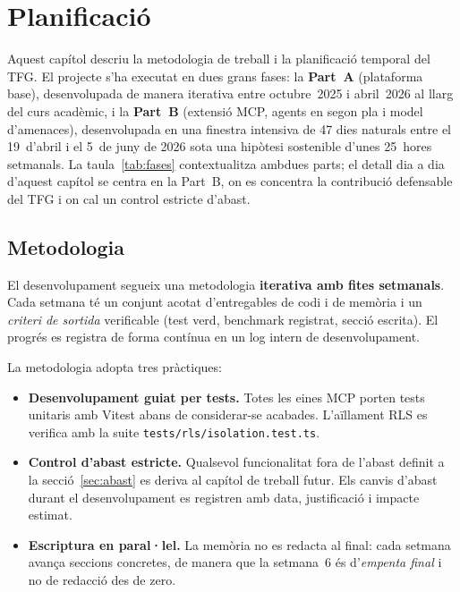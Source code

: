 \chapter{Planificació}
\label{ch:planificacio}

Aquest capítol descriu la metodologia de treball i la planificació
temporal del TFG. El projecte s'ha executat en dues grans fases: la
\textbf{Part~A} (plataforma base), desenvolupada de manera iterativa
entre octubre~2025 i abril~2026 al llarg del curs acadèmic, i la
\textbf{Part~B} (extensió MCP, agents en segon pla i model d'amenaces),
desenvolupada en una finestra intensiva de 47 dies naturals entre el
19~d'abril i el 5~de juny de 2026 sota una hipòtesi sostenible d'unes
25~hores setmanals. La taula~\ref{tab:fases} contextualitza ambdues
parts; el detall dia a dia d'aquest capítol se centra en la Part~B,
on es concentra la contribució defensable del TFG i on cal un control
estricte d'abast.

\section{Metodologia}
\label{sec:metodologia}

El desenvolupament segueix una metodologia \textbf{iterativa amb fites
setmanals}. Cada setmana té un conjunt acotat d'entregables de codi i de
memòria i un \emph{criteri de sortida} verificable (test verd, benchmark
registrat, secció escrita). El progrés es registra de forma contínua en
un log intern de desenvolupament.

La metodologia adopta tres pràctiques:

\begin{itemize}
  \item \textbf{Desenvolupament guiat per tests.} Totes les eines MCP
    porten tests unitaris amb Vitest abans de considerar-se acabades.
    L'aïllament RLS es verifica amb la suite
    \texttt{tests/rls/isolation.test.ts}.
  \item \textbf{Control d'abast estricte.} Qualsevol funcionalitat fora
    de l'abast definit a la secció~\ref{sec:abast} es deriva al capítol
    de treball futur. Els canvis d'abast durant el desenvolupament es
    registren amb data, justificació i impacte estimat.
  \item \textbf{Escriptura en paral·lel.} La memòria no es redacta al
    final: cada setmana avança seccions concretes, de manera que la
    setmana~6 és d'\emph{empenta final} i no de redacció des de zero.
\end{itemize}

